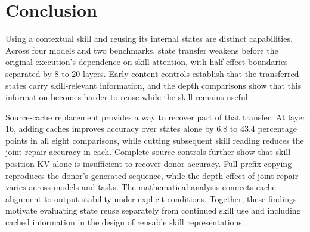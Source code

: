 \section{Conclusion}
\label{sec:conclusion}

Using a contextual skill and reusing its internal states are distinct
capabilities. Across four models and two benchmarks, state transfer
weakens before the original execution's dependence on skill attention,
with half-effect boundaries separated by $8$ to $20$ layers.
Early content controls establish that the transferred states carry
skill-relevant information, and the depth comparisons show that this
information becomes harder to reuse while the skill remains useful.

Source-cache replacement provides a way to recover part of that transfer.
At layer $16$, adding caches improves accuracy over states alone by
$6.8$ to $43.4$ percentage points in all eight comparisons, while cutting
subsequent skill reading reduces the joint-repair accuracy in each.
Complete-source controls further show that skill-position KV alone is
insufficient to recover donor accuracy. Full-prefix copying reproduces
the donor's generated sequence, while the depth effect of joint repair
varies across models and tasks.
The mathematical analysis connects cache alignment to output stability
under explicit conditions. Together, these findings motivate evaluating
state reuse separately from continued skill use and including cached
information in the design of reusable skill representations.
